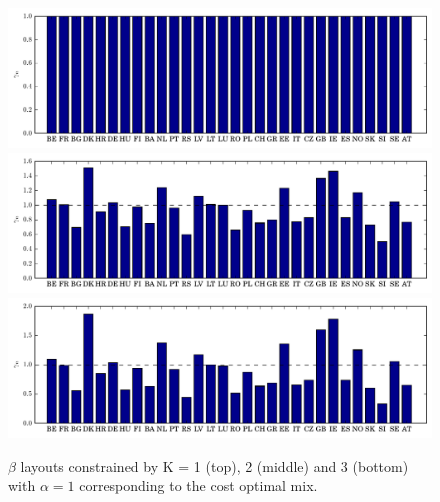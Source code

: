 \documentclass[a4paper, 12pt, sort&compress]{elsarticle}%
\newcommand{\chromowidth}{1.05 \columnwidth}
\begin{document}
\begin{figure}
  \centering
  \includegraphics[width = \chromowidth, center]{k=1cfMax}
  \includegraphics[width = \chromowidth, center]{k=2beta}
  \includegraphics[width = \chromowidth, center]{k=3beta}
  \caption{$\beta$ layouts constrained by K = 1 (top), 2 (middle) and
    3 (bottom) with $\alpha = 1$ corresponding to the cost optimal mix. }
  \label{fig:beta}
\end{figure}
\end{document}
